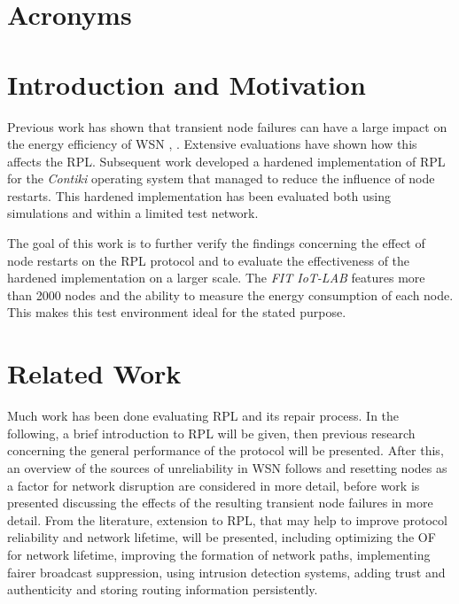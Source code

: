 \documentclass[
  a4paper,
  11pt,
  style=screen,
  extramargin,
  bcor=10mm,
  rgb,
  hyperrefdark,
  abstract=off,
  lnum,
]{tubsartcl}
\newcommand{\fitlab}{\emph{FIT IoT-LAB} }
\begin{document}


\setcounter{secnumdepth}{0}
\section{Acronyms}



\newpage

\setcounter{secnumdepth}{1}

\section{Introduction and Motivation} %

Previous work has shown that transient node failures can have a large impact on the energy efficiency of \ac{WSN} \cite{kulau2017energy}, \cite{mueller2017}.
Extensive evaluations have shown how this affects the \ac{RPL}. Subsequent work developed a hardened implementation of \ac{RPL} for the \emph{Contiki} operating system that managed to reduce the influence of node restarts.
This hardened implementation has been evaluated both using simulations and within a limited test network.

The goal of this work is to further verify the findings concerning the effect of node restarts on the \ac{RPL} protocol and to evaluate the effectiveness of the hardened implementation on a larger scale.
The \fitlab features more than 2000 nodes and the ability to measure the energy consumption of each node. This makes this test environment ideal for the stated purpose.

\section{Related Work} %

Much work has been done evaluating \ac{RPL} and its repair process.
In the following, a brief introduction to \ac{RPL} will be given, then previous research concerning the general performance of the protocol will be presented.
After this, an overview of the sources of unreliability in \ac{WSN} follows and resetting nodes as a factor for network disruption are considered in more detail, before work is presented discussing the effects of the resulting transient node failures in more detail.
From the literature, extension to \ac{RPL}, that may help to improve protocol reliability and network lifetime, will be presented, including optimizing the \ac{OF} for network lifetime, improving the formation of network paths, implementing fairer broadcast suppression, using intrusion detection systems, adding trust and authenticity and storing routing information persistently.
\end{document}
